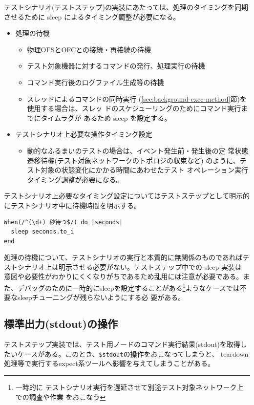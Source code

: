 テストシナリオ(テストステップ)の実装にあたっては、処理のタイミングを同期
させるために sleep によるタイミング調整が必要になる。
\begin{itemize}
 \item 処理の待機
       \begin{itemize}
        \item 物理OFSとOFCとの接続・再接続の待機
        \item テスト対象機器に対するコマンドの発行、処理実行の待機
        \item コマンド実行後のログファイル生成等の待機
        \item スレッドによるコマンドの同時実行
              (\ref{sec:background-exec-method}節)を使用する場合は、スレッ
              ドのスケジューリングのためにコマンド実行までにタイムラグが
              あるため sleep を設定する。
       \end{itemize}
 \item テストシナリオ上必要な操作タイミング設定
       \begin{itemize}
        \item 動的なふるまいのテストの場合は、イベント発生前・発生後の定
              常状態遷移待機(テスト対象ネットワークのトポロジの収束など)
              のように、テスト対象の状態変化にかかる時間にあわせたテスト
              オペレーション実行タイミング調整が必要になる。
       \end{itemize}
\end{itemize}

テストシナリオ上必要なタイミング設定についてはテストステップとして明示的
にテストシナリオ中に待機時間を明示する。
\begin{lstlisting}
When(/^(\d+) 秒待つ$/) do |seconds|
  sleep seconds.to_i
end
\end{lstlisting}

処理の待機について、テストシナリオの実行と本質的に無関係のものであればテ
ストシナリオ上は明示させる必要がない。テストステップ中での sleep 実装は
意図や必要性がわかりにくくなりがちであるため乱用には注意が必要である。ま
た、デバッグのために一時的にsleepを設定することがある\footnote{一時的に
テストシナリオ実行を遅延させて別途テスト対象ネットワーク上での調査や作業
をおこなう}ようなケースでは不要なsleepチューニングが残らないようにする必
要がある。

  \subsection{標準出力(stdout)の操作}
テストステップ実装では、テスト用ノードのコマンド実行結果(stdout)を取得し
たいケースがある。このとき、\verb|$stdout|の操作をおこなってしまうと、
teardown処理等で実行するexpect系ツールへ影響を与えてしまうことがある。

